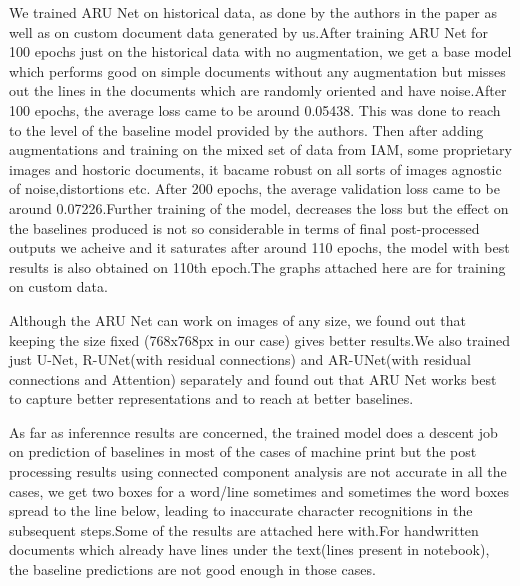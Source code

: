 %

We trained ARU Net on historical data, as done by the authors in the paper as well as on custom document data generated by us.After training ARU Net for 100 epochs just on the historical data with no augmentation, we get a base model which performs good on simple documents without any augmentation but misses out the lines in the documents which are randomly oriented and have noise.After 100 epochs, the average loss came to be around 0.05438. This was done to reach to the level of the baseline model provided by the authors. Then after adding augmentations and training on the mixed set of data from IAM, some proprietary images and hostoric documents, it bacame robust on all sorts of images agnostic of noise,distortions etc. After 200 epochs, the average validation loss came to be around 0.07226.Further training of the model, decreases the loss but the effect on the baselines produced is not so considerable in terms of final post-processed outputs we acheive and it saturates after around 110 epochs, the model with best results is also obtained on 110th epoch.The graphs attached here are for training on custom data.

Although the ARU Net can work on images of any size, we found out that keeping the size fixed (768x768px in our case)  gives better results.We also trained just U-Net, R-UNet(with residual connections) and AR-UNet(with residual connections and Attention) separately and found out that ARU Net works best to capture better representations and to reach at better baselines.

As far as inferennce results are concerned, the trained model does a descent job on prediction of baselines in most of the cases of machine print but the post processing results using connected component analysis are not accurate in all the cases, we get two boxes for a word/line sometimes and sometimes the word boxes spread to the line below, leading to inaccurate character recognitions in the subsequent steps.Some of the results are attached here with.For handwritten documents which already have lines under the text(lines present in notebook), the baseline predictions are not good enough in those cases.

